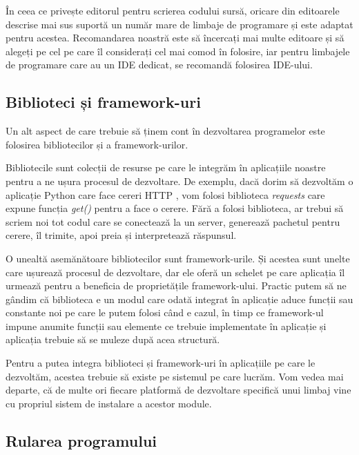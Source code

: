 În ceea ce privește editorul pentru scrierea codului sursă, oricare din
editoarele descrise mai sus suportă un număr mare de limbaje de programare și
este adaptat pentru acestea. Recomandarea noastră este să încercați mai multe
editoare și să alegeți pe cel pe care îl considerați cel mai comod în folosire,
iar pentru limbajele de programare care au un IDE dedicat, se recomandă
folosirea IDE-ului.

\subsection{Biblioteci și framework-uri}
\label{sec:appdev:dev:libs}

Un alt aspect de care trebuie să ținem cont în dezvoltarea programelor este
folosirea bibliotecilor și a framework-urilor.

Bibliotecile sunt colecții de resurse pe care le integrăm în aplicațiile noastre
pentru a ne ușura procesul de dezvoltare. De exemplu, dacă dorim să dezvoltăm o
aplicație Python care face cereri HTTP , vom folosi biblioteca \textit{requests} care expune funcția
\textit{get()} pentru a face o cerere. Fără a folosi biblioteca, ar trebui să
scriem noi tot codul care se conectează la un server, generează pachetul pentru
cerere, îl trimite, apoi preia și interpretează răspunsul.

O unealtă asemănătoare bibliotecilor sunt framework-urile. Și acestea sunt
unelte care ușurează procesul de dezvoltare, dar ele oferă un schelet pe care
aplicația îl urmează pentru a beneficia de proprietățile framework-ului. Practic
putem să ne gândim că biblioteca e un modul care odată integrat în aplicație
aduce funcții sau constante noi pe care le putem folosi când e cazul, în timp ce
framework-ul impune anumite funcții sau elemente ce trebuie implementate în
aplicație și aplicația trebuie să se muleze după acea structură.

Pentru a putea integra biblioteci și framework-uri în aplicațiile pe care le
dezvoltăm, acestea trebuie să existe pe sistemul pe care lucrăm. Vom vedea mai
departe, că de multe ori fiecare platformă de dezvoltare specifică unui limbaj
vine cu propriul sistem de instalare a acestor module.

\subsection{Rularea programului}
\label{sec:appdev:dev:run}


